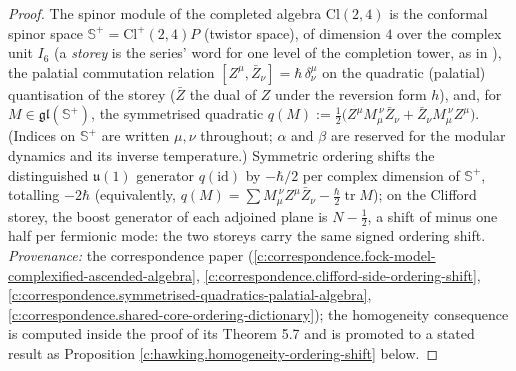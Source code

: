 \documentclass[11pt]{article}
\theoremstyle{definition}
\theoremstyle{plain}
\providecommand{\CS}{}\renewcommand{\CS}{{\mathbb{S}^{+}}}
\providecommand{\Cl}{}\renewcommand{\Cl}{\mathrm{Cl}}
\providecommand{\id}{}\renewcommand{\id}{\mathrm{id}}
\providecommand{\tr}{}\renewcommand{\tr}{\operatorname{tr}}
\begin{document}
\begin{proof}
The spinor module of the completed algebra $\Cl(2,4)$ is the conformal spinor space $\CS = \Cl^+(2,4)P$ (twistor space), of dimension $4$ over the complex unit $I_6$ (a \emph{storey} is the series' word for one level of the completion tower, as in \cite{ButlerT9}), the palatial commutation relation $[Z^\mu, \bar Z_\nu] = \hbar\,\delta^\mu_\nu$ on the quadratic (palatial) quantisation of the storey ($\bar Z$ the dual of $Z$ under the reversion form $h$), and, for $M \in \mathfrak{gl}(\CS)$, the symmetrised quadratic $q(M) := \tfrac12\bigl(Z^\mu M_\mu^{\ \nu}\bar Z_\nu + \bar Z_\nu M_\mu^{\ \nu} Z^\mu\bigr)$. (Indices on $\CS$ are written $\mu, \nu$ throughout; $\alpha$ and $\beta$ are reserved for the modular dynamics and its inverse temperature.) Symmetric ordering shifts the distinguished $\mathfrak{u}(1)$ generator $q(\id)$ by $-\hbar/2$ per complex dimension of $\CS$, totalling $-2\hbar$ (equivalently, $q(M) = \sum M_\mu^{\ \nu} Z^\mu \bar Z_\nu - \tfrac{\hbar}{2}\tr M$); on the Clifford storey, the boost generator of each adjoined plane is $N - \tfrac12$, a shift of minus one half per fermionic mode: the two storeys carry the same signed ordering shift. \emph{Provenance:} the correspondence paper \cite[Thm.~3.1, Rem.~3.2, \S 5, Lem.~5.5, Prop.~5.6, Thm.~5.7]{ButlerT9} (\ref{c:correspondence.fock-model-complexified-ascended-algebra}, \ref{c:correspondence.clifford-side-ordering-shift}, \ref{c:correspondence.symmetrised-quadratics-palatial-algebra}, \ref{c:correspondence.shared-core-ordering-dictionary}); the homogeneity consequence is computed inside the proof of its Theorem 5.7 and is promoted to a stated result as Proposition \ref{c:hawking.homogeneity-ordering-shift} below.

\end{proof}
\end{document}
